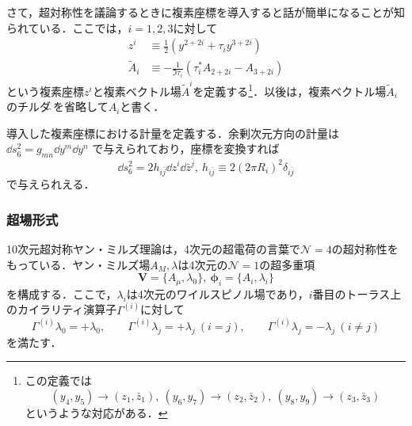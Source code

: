 \documentclass[a4paper,uplatex,dvipdfmx]{jsarticle}
\theoremstyle{definition}
\begin{document}
さて，超対称性を議論するときに複素座標を導入すると話が簡単になることが知られている．ここでは，$i=1,2,3$に対して
\begin{align}
   z^{i}
   &\equiv
   \frac{1}{2}(y^{2+2i}+\tau_{i}y^{3+2i})
   \nonumber
   \\
   \tilde{A}_{i}
   &\equiv
   -
   \frac{1}{\Im\tau_{i}}(\tau_{i}^{*}A_{2+2i}-A_{3+2i})
   \nonumber
\end{align}
という複素座標$z^{i}$と複素ベクトル場$\tilde{A}^{i}$を定義する\footnote{
   この定義では
   $$
      (y_{4},y_{5})
      \rightarrow
      (z_{1},\bar{z}_{1})
      ,\ 
      (y_{6},y_{7})
      \rightarrow
      (z_{2},\bar{z}_{2})
      ,\ 
      (y_{8},y_{9})
      \rightarrow
      (z_{3},\bar{z}_{3})
   $$
   というような対応がある．
}．以後は，複素ベクトル場$\tilde{A}_{i}$のチルダ$\tilde{\ }$を省略して$A_{i}$と書く．

導入した複素座標における計量を定義する．余剰次元方向の計量は
$
   \dd s_{6}^{2}
   =
   g_{mn}\dd y^{m}\dd y^{n}
$
で与えられており，座標を変換すれば
\begin{equation}
   \dd s_{6}^{2}
   =
   2h_{i\bar{j}}
   \dd z^{i}\dd \bar{z}^{\bar{j}}
   ,\ 
   h_{i\bar{j}}
   \equiv
   2(2\pi R_{i})^2\delta_{i\bar{j}}
   \nonumber
\end{equation}
で与えられえる．


\subsubsection{超場形式}

10次元超対称ヤン・ミルズ理論は，4次元の超電荷の言葉で$\mathcal{N}=4$の超対称性をもっている．ヤン・ミルズ場$A_{M},\lambda$は4次元の$\mathcal{N}=1$の超多重項
\begin{equation}
   \bm{V}
   =
   \{A_{\mu},\lambda_{0}\}
   ,\ 
   \bm{\phi}_{i}
   =
   \{A_{i},\lambda_{i}\}
   \nonumber
\end{equation}
を構成する．ここで，$\lambda_{i}$は4次元のワイルスピノル場であり，$i$番目のトーラス上のカイラリティ演算子$\Gamma^{(i)}$に対して
\begin{equation}
   \Gamma^{(i)}
   \lambda_{0}
   =
   +\lambda_{0}
   ,\qquad
   \Gamma^{(i)}
   \lambda_{j}
   =
   +\lambda_{j}
   \ 
   (i=j)
   ,\qquad
   \Gamma^{(i)}
   \lambda_{j}
   =
   -\lambda_{j}
   \ 
   (i\neq j)
   \nonumber
\end{equation}
を満たす．
\end{document}
